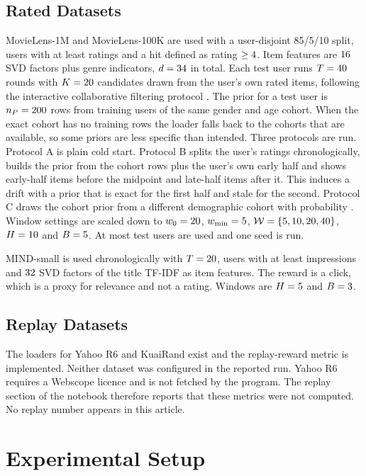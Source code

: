 \subsection{Rated Datasets}
MovieLens-1M and MovieLens-100K \cite{harper2015} are used with a user-disjoint 85/5/10 split, users with at least \mlMinRatings{} ratings and a hit defined as rating $\ge4$. Item features are $16$ SVD factors plus genre indicators, $d=34$ in total. Each test user runs $T=40$ rounds with $K=20$ candidates drawn from the user's own rated items, following the interactive collaborative filtering protocol \cite{zhao2013,zou2020}. The prior for a test user is $n_P=200$ rows from training users of the same gender and age cohort. When the exact cohort has no training rows the loader falls back to the cohorts that are available, so some priors are less specific than intended. Three protocols are run. Protocol A is plain cold start. Protocol B splits the user's ratings chronologically, builds the prior from the cohort rows plus the user's own early half and shows early-half items before the midpoint and late-half items after it. This induces a drift with a prior that is exact for the first half and stale for the second. Protocol C draws the cohort prior from a different demographic cohort with probability \mlPmis. Window settings are scaled down to $w_0=20$, $w_{\min}=5$, $\mathcal W=\{5, 10, 20, 40\}$, $H=10$ and $B=5$. At most \mlMaxUsers{} test users are used and one seed is run.

MIND-small \cite{wu2020} is used chronologically with $T=20$, users with at least \mindMinImp{} impressions and $32$ SVD factors of the title TF-IDF as item features. The reward is a click, which is a proxy for relevance and not a rating. Windows are $H=5$ and $B=3$.

\subsection{Replay Datasets}
The loaders for Yahoo R6 and KuaiRand exist and the replay-reward metric is implemented. Neither dataset was configured in the reported run. Yahoo R6 requires a Webscope licence and is not fetched by the program. The replay section of the notebook therefore reports that these metrics were not computed. No replay number appears in this article.

\section{Experimental Setup}
\label{sec:setup}

